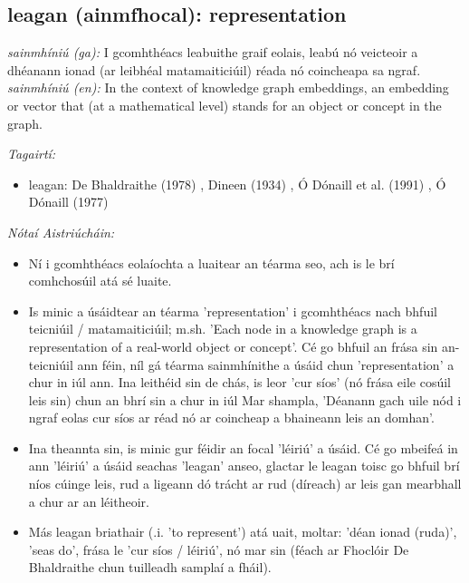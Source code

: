 \documentclass{article}
\begin{document}
\subsection*{leagan (ainmfhocal): representation} 
 \noindent \textit{sainmhíniú (ga):} I gcomhthéacs leabuithe graif eolais, leabú nó veicteoir a dhéanann ionad (ar leibhéal matamaiticiúil) réada nó coincheapa sa ngraf.
\newline\newline
 \noindent \textit{sainmhíniú (en):} In the context of knowledge graph embeddings, an embedding or vector that (at a mathematical level) stands for an object or concept in the graph.
\newline

 \noindent \textit{Tagairtí:}
\begin{itemize}
	\item leagan: De Bhaldraithe (1978) \cite{de-bhaldraithe}, Dineen (1934) \cite{dineen}, Ó Dónaill et al. (1991) \cite{focloir-beag}, Ó Dónaill (1977) \cite{odonaill}
\end{itemize}

 \noindent \textit{Nótaí Aistriúcháin:}
\begin{itemize}
	\item Ní i gcomhthéacs eolaíochta a luaitear an téarma seo, ach is le brí comhchosúil atá sé luaite.
	\item Is minic a úsáidtear an téarma 'representation' i gcomhthéacs nach bhfuil teicniúil / matamaiticiúil; m.sh. 'Each node in a knowledge graph is a representation of a real-world object or concept'. Cé go bhfuil an frása sin an-teicniúil ann féin, níl gá téarma sainmhínithe a úsáid chun 'representation' a chur in iúl ann. Ina leithéid sin de chás, is leor 'cur síos' (nó frása eile cosúil leis sin) chun an bhrí sin a chur in iúl Mar shampla, 'Déanann gach uile nód i ngraf eolas cur síos ar réad nó ar coincheap a bhaineann leis an domhan'.
	\item Ina theannta sin, is minic gur féidir an focal 'léiriú' a úsáid. Cé go mbeifeá in ann 'léiriú' a úsáid seachas 'leagan' anseo, glactar le leagan toisc go bhfuil brí níos cúinge leis, rud a ligeann dó trácht ar rud (díreach) ar leis gan mearbhall a chur ar an léitheoir.
	\item Más leagan briathair (.i. 'to represent') atá uait, moltar: 'déan ionad (ruda)', 'seas do', frása le 'cur síos / léiriú', nó mar sin (féach ar Fhoclóir De Bhaldraithe chun tuilleadh samplaí a fháil).
\end{itemize}
\end{document}
